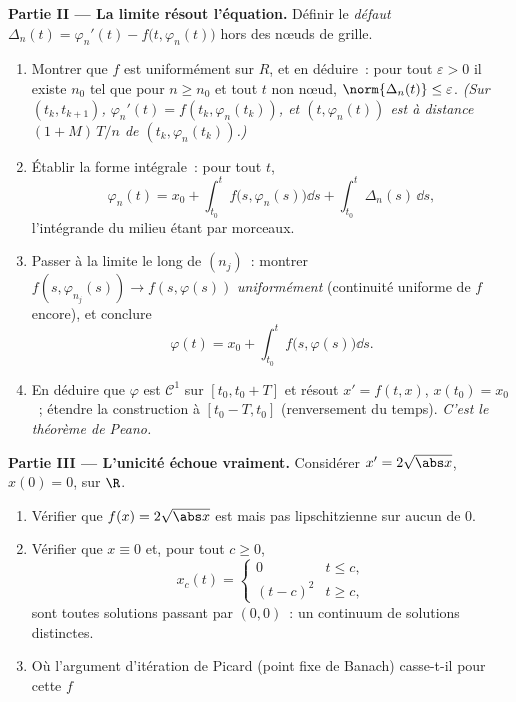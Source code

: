 \begin{problem}[{Problème de fin de semaine --- existence de
solutions de $x' = f(t, x)$ sans Lipschitz}]
\medskip
\noindent\textbf{Partie II --- La limite résout l'équation.}
Définir le \emph{défaut} $\Delta_n(t) = \varphi_n'(t) -
f\bigl(t, \varphi_n(t)\bigr)$ hors des nœuds de grille.
\begin{enumerate}[resume]
  \item Montrer que $f$ est uniformément  sur $R$, et
        en déduire~: pour tout $\varepsilon > 0$ il existe
        $n_0$ tel que pour $n \geq n_0$ et tout $t$ non nœud,
        $\norm{\Delta_n(t)} \leq \varepsilon$. \emph{(Sur
        $(t_k, t_{k+1})$, $\varphi_n'(t) = f(t_k,
        \varphi_n(t_k))$, et $(t, \varphi_n(t))$ est à
        distance $(1 + M)\,T/n$ de $(t_k,
        \varphi_n(t_k))$.)}
  \item Établir la forme intégrale~: pour tout $t$,
        \[
        \varphi_n(t) = x_0 + \int_{t_0}^{t}
        f\bigl(s, \varphi_n(s)\bigr)\dd s +
        \int_{t_0}^t \Delta_n(s)\,\dd s,
        \]
        l'intégrande du milieu étant  par morceaux.
  \item Passer à la limite le long de $(n_j)$~: montrer
        $f(s, \varphi_{n_j}(s)) \to f(s, \varphi(s))$
        \emph{uniformément} (continuité uniforme de $f$
        encore), et conclure
        \[
        \varphi(t) = x_0 + \int_{t_0}^t
        f\bigl(s, \varphi(s)\bigr)\dd s .
        \]
  \item En déduire que $\varphi$ est $\mathcal C^1$ sur $[t_0,
        t_0 + T]$ et résout $x' = f(t, x)$, $x(t_0) = x_0$~;
        étendre la construction à $[t_0 - T, t_0]$ (renversement
        du temps). \emph{C'est le théorème de Peano.}
\end{enumerate}

\medskip
\noindent\textbf{Partie III --- L'unicité échoue vraiment.}
Considérer $x' = 2\sqrt{\abs x}$, $x(0) = 0$, sur $\R$.
\begin{enumerate}[resume]
  \item Vérifier que $f(x) = 2\sqrt{\abs x}$ est  mais
        pas lipschitzienne sur aucun  de $0$.
  \item Vérifier que $x \equiv 0$ et, pour tout $c \geq 0$,
        \[
        x_c(t) = \begin{cases} 0 & t \leq c,\\ (t - c)^2 & t
        \geq c,\end{cases}
        \]
        sont toutes solutions passant par $(0,0)$~: un
        continuum de solutions distinctes.
  \item Où l'argument d'itération de Picard (point fixe de
        Banach) casse-t-il pour cette $f$~
\end{enumerate}


\end{problem}
